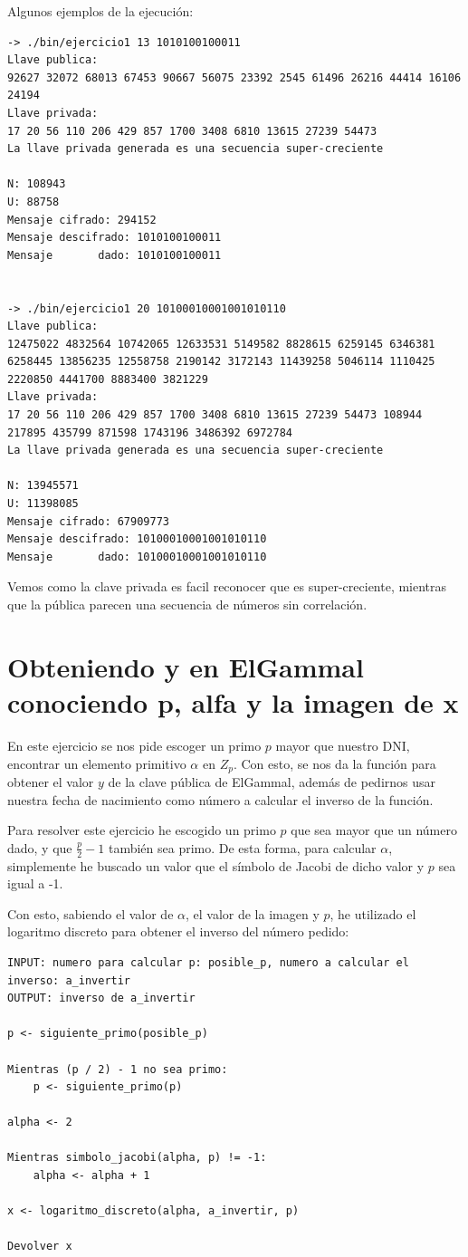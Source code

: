 \documentclass[12pt, spanish]{article}
\begin{document}
Algunos ejemplos de la ejecución:

\begin{lstlisting}
-> ./bin/ejercicio1 13 1010100100011
Llave publica:
92627 32072 68013 67453 90667 56075 23392 2545 61496 26216 44414 16106 24194
Llave privada:
17 20 56 110 206 429 857 1700 3408 6810 13615 27239 54473
La llave privada generada es una secuencia super-creciente

N: 108943
U: 88758
Mensaje cifrado: 294152
Mensaje descifrado: 1010100100011
Mensaje       dado: 1010100100011


-> ./bin/ejercicio1 20 10100010001001010110
Llave publica:
12475022 4832564 10742065 12633531 5149582 8828615 6259145 6346381 6258445 13856235 12558758 2190142 3172143 11439258 5046114 1110425 2220850 4441700 8883400 3821229
Llave privada:
17 20 56 110 206 429 857 1700 3408 6810 13615 27239 54473 108944 217895 435799 871598 1743196 3486392 6972784
La llave privada generada es una secuencia super-creciente

N: 13945571
U: 11398085
Mensaje cifrado: 67909773
Mensaje descifrado: 10100010001001010110
Mensaje       dado: 10100010001001010110
\end{lstlisting}

Vemos como la clave privada es facil reconocer que es super-creciente, mientras que la pública parecen una secuencia de números sin correlación.

\section{Obteniendo y en ElGammal conociendo p, alfa y la imagen de x}

En este ejercicio se nos pide escoger un primo $p$ mayor que nuestro DNI, encontrar un elemento primitivo $\alpha$ en $Z_p$. Con esto, se nos da la función para obtener el valor $y$ de la clave pública de ElGammal, además de pedirnos usar nuestra fecha de nacimiento como número a calcular el inverso de la función.

Para resolver este ejercicio he escogido un primo $p$ que sea mayor que un número dado, y que $\frac{p}{2} - 1$ también sea primo. De esta forma, para calcular $\alpha$, simplemente he buscado un valor que el símbolo de Jacobi de dicho valor y $p$ sea igual a -1.

Con esto, sabiendo el valor de $\alpha$, el valor de la imagen y $p$, he utilizado el logaritmo discreto para obtener el inverso del número pedido:

\begin{lstlisting}[caption={Ejercicio 2}]
INPUT: numero para calcular p: posible_p, numero a calcular el inverso: a_invertir
OUTPUT: inverso de a_invertir

p <- siguiente_primo(posible_p)

Mientras (p / 2) - 1 no sea primo:
	p <- siguiente_primo(p)

alpha <- 2

Mientras simbolo_jacobi(alpha, p) != -1:
	alpha <- alpha + 1

x <- logaritmo_discreto(alpha, a_invertir, p)

Devolver x
\end{lstlisting}
\end{document}
